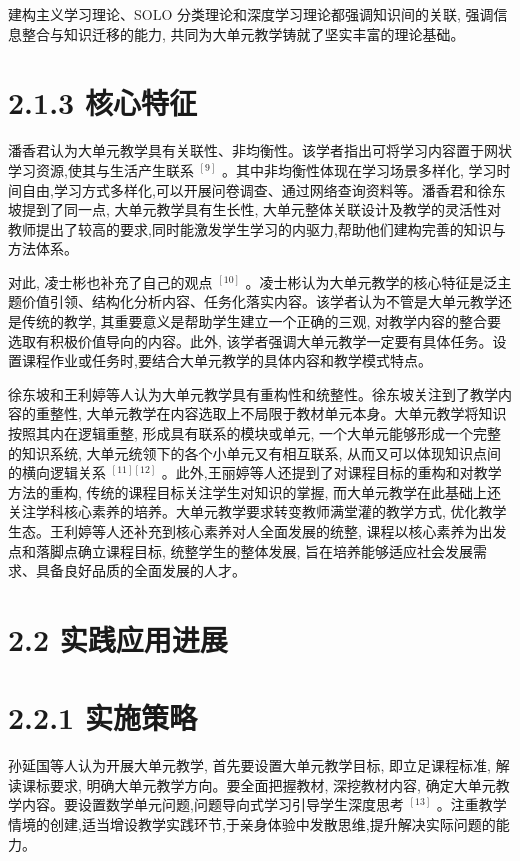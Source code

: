 \documentclass[10pt]{article}
\begin{document}
建构主义学习理论、SOLO 分类理论和深度学习理论都强调知识间的关联, 强调信息整合与知识迁移的能力, 共同为大单元教学铸就了坚实丰富的理论基础。

\section*{2.1.3 核心特征}

潘香君认为大单元教学具有关联性、非均衡性。该学者指出可将学习内容置于网状学习资源,使其与生活产生联系 \({}^{\left\lbrack  9\right\rbrack  }\) 。其中非均衡性体现在学习场景多样化, 学习时间自由,学习方式多样化,可以开展问卷调查、通过网络查询资料等。潘香君和徐东坡提到了同一点, 大单元教学具有生长性, 大单元整体关联设计及教学的灵活性对教师提出了较高的要求,同时能激发学生学习的内驱力,帮助他们建构完善的知识与方法体系。

对此, 凌士彬也补充了自己的观点 \({}^{\left\lbrack  {10}\right\rbrack  }\) 。凌士彬认为大单元教学的核心特征是泛主题价值引领、结构化分析内容、任务化落实内容。该学者认为不管是大单元教学还是传统的教学, 其重要意义是帮助学生建立一个正确的三观, 对教学内容的整合要选取有积极价值导向的内容。此外, 该学者强调大单元教学一定要有具体任务。设置课程作业或任务时,要结合大单元教学的具体内容和教学模式特点。

徐东坡和王利婷等人认为大单元教学具有重构性和统整性。徐东坡关注到了教学内容的重整性, 大单元教学在内容选取上不局限于教材单元本身。大单元教学将知识按照其内在逻辑重整, 形成具有联系的模块或单元, 一个大单元能够形成一个完整的知识系统, 大单元统领下的各个小单元又有相互联系, 从而又可以体现知识点间的横向逻辑关系 \({}^{\left\lbrack  {11}\right\rbrack  \left\lbrack  {12}\right\rbrack  }\) 。此外,王丽婷等人还提到了对课程目标的重构和对教学方法的重构, 传统的课程目标关注学生对知识的掌握, 而大单元教学在此基础上还关注学科核心素养的培养。大单元教学要求转变教师满堂灌的教学方式, 优化教学生态。王利婷等人还补充到核心素养对人全面发展的统整, 课程以核心素养为出发点和落脚点确立课程目标, 统整学生的整体发展, 旨在培养能够适应社会发展需求、具备良好品质的全面发展的人才。

\section*{2.2 实践应用进展}

\section*{2.2.1 实施策略}

孙延国等人认为开展大单元教学, 首先要设置大单元教学目标, 即立足课程标准, 解读课标要求, 明确大单元教学方向。要全面把握教材, 深挖教材内容, 确定大单元教学内容。要设置数学单元问题,问题导向式学习引导学生深度思考 \({}^{\left\lbrack  {13}\right\rbrack  }\) 。注重教学情境的创建,适当增设教学实践环节,于亲身体验中发散思维,提升解决实际问题的能力。
\end{document}
